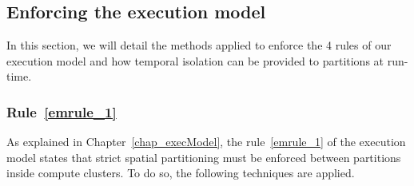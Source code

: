 \documentclass[main.tex]{subfiles}
\begin{document}
\subsection{Enforcing the execution model}
\label{ssec_implemExecModel_enforceEMrules}
In this section, we will detail the methods applied to enforce the 4 rules of our execution model and how temporal isolation can be provided to partitions at run-time.

\subsubsection{Rule~\ref{emrule_1}}
As explained in Chapter~\ref{chap_execModel}, the rule~\ref{emrule_1} of the execution model states that strict spatial partitioning must be enforced between partitions inside compute clusters. To do so, the following techniques are applied.
\end{document}
